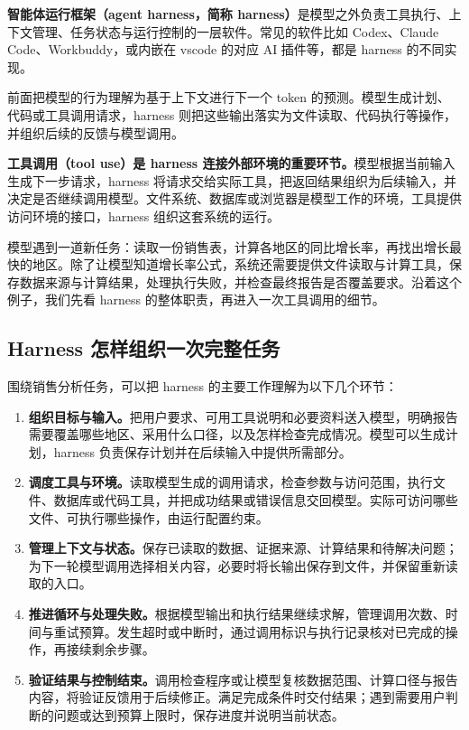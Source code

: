 \textbf{智能体运行框架（agent harness，简称 harness）}是模型之外负责工具执行、上下文管理、任务状态与运行控制的一层软件。常见的软件比如 Codex、Claude Code、Workbuddy，或内嵌在 vscode 的对应 AI 插件等，都是 harness 的不同实现。

前面把模型的行为理解为基于上下文进行下一个 token 的预测。模型生成计划、代码或工具调用请求，harness 则把这些输出落实为文件读取、代码执行等操作，并组织后续的反馈与模型调用。

\textbf{工具调用（tool use）是 harness 连接外部环境的重要环节。}模型根据当前输入生成下一步请求，harness 将请求交给实际工具，把返回结果组织为后续输入，并决定是否继续调用模型。文件系统、数据库或浏览器是模型工作的环境，工具提供访问环境的接口，harness 组织这套系统的运行。

模型遇到一道新任务：读取一份销售表，计算各地区的同比增长率，再找出增长最快的地区。除了让模型知道增长率公式，系统还需要提供文件读取与计算工具，保存数据来源与计算结果，处理执行失败，并检查最终报告是否覆盖要求。沿着这个例子，我们先看 harness 的整体职责，再进入一次工具调用的细节。

\subsection{Harness 怎样组织一次完整任务}

围绕销售分析任务，可以把 harness 的主要工作理解为以下几个环节：
\begin{enumerate}
    \item \textbf{组织目标与输入。}把用户要求、可用工具说明和必要资料送入模型，明确报告需要覆盖哪些地区、采用什么口径，以及怎样检查完成情况。模型可以生成计划，harness 负责保存计划并在后续输入中提供所需部分。
    \item \textbf{调度工具与环境。}读取模型生成的调用请求，检查参数与访问范围，执行文件、数据库或代码工具，并把成功结果或错误信息交回模型。实际可访问哪些文件、可执行哪些操作，由运行配置约束。
    \item \textbf{管理上下文与状态。}保存已读取的数据、证据来源、计算结果和待解决问题；为下一轮模型调用选择相关内容，必要时将长输出保存到文件，并保留重新读取的入口。
    \item \textbf{推进循环与处理失败。}根据模型输出和执行结果继续求解，管理调用次数、时间与重试预算。发生超时或中断时，通过调用标识与执行记录核对已完成的操作，再接续剩余步骤。
    \item \textbf{验证结果与控制结束。}调用检查程序或让模型复核数据范围、计算口径与报告内容，将验证反馈用于后续修正。满足完成条件时交付结果；遇到需要用户判断的问题或达到预算上限时，保存进度并说明当前状态。
\end{enumerate}

